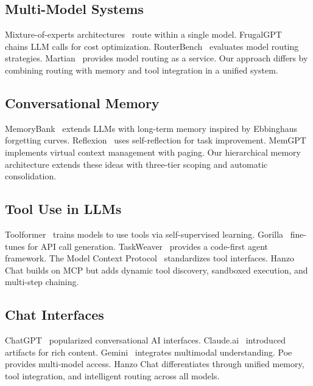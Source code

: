 \documentclass[11pt,twocolumn]{article}
\begin{document}
\subsection{Multi-Model Systems}

Mixture-of-experts architectures~\cite{shazeer2017outrageously,fedus2022switch} route within a single model. FrugalGPT~\cite{chen2023frugalgpt} chains LLM calls for cost optimization. RouterBench~\cite{hu2024routerbench} evaluates model routing strategies. Martian~\cite{martian2024} provides model routing as a service. Our approach differs by combining routing with memory and tool integration in a unified system.

\subsection{Conversational Memory}

MemoryBank~\cite{zhong2024memorybank} extends LLMs with long-term memory inspired by Ebbinghaus forgetting curves. Reflexion~\cite{shinn2023reflexion} uses self-reflection for task improvement. MemGPT~\cite{packer2023memgpt} implements virtual context management with paging. Our hierarchical memory architecture extends these ideas with three-tier scoping and automatic consolidation.

\subsection{Tool Use in LLMs}

Toolformer~\cite{schick2023toolformer} trains models to use tools via self-supervised learning. Gorilla~\cite{patil2023gorilla} fine-tunes for API call generation. TaskWeaver~\cite{qin2024taskweaver} provides a code-first agent framework. The Model Context Protocol~\cite{anthropic2024mcp} standardizes tool interfaces. Hanzo Chat builds on MCP but adds dynamic tool discovery, sandboxed execution, and multi-step chaining.

\subsection{Chat Interfaces}

ChatGPT~\cite{openai2022chatgpt} popularized conversational AI interfaces. Claude.ai~\cite{anthropic2024claude} introduced artifacts for rich content. Gemini~\cite{google2024gemini} integrates multimodal understanding. Poe~\cite{quora2023poe} provides multi-model access. Hanzo Chat differentiates through unified memory, tool integration, and intelligent routing across all models.
\end{document}
